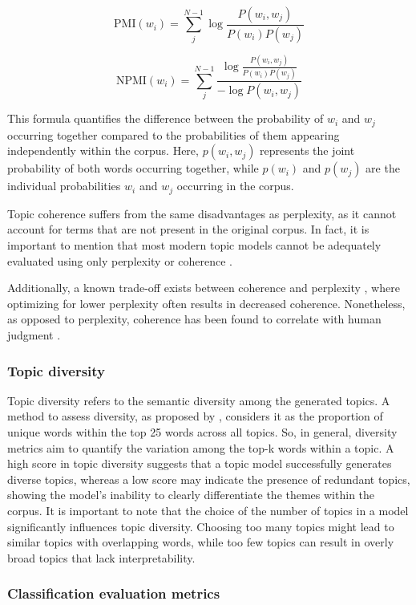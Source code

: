 \[
\text{PMI}(w_i) = \sum_{j}^{N-1} \log \frac{P(w_i, w_j)}{P(w_i) P(w_j)}
\]

\[
\text{NPMI}(w_i) = \sum_{j}^{N-1} \frac{\log \frac{P(w_i, w_j)}{P(w_i) P(w_j)}}{-\log P(w_i, w_j)}
\]

This formula quantifies the difference between the probability of $w_i$ and $w_j$ occurring together compared to the probabilities of them appearing independently within the corpus. Here, $p(w_i,w_j)$ represents the joint probability of both words occurring together, while $p(w_i)$ and $p(w_j)$ are the individual probabilities $w_i$ and $w_j$ occurring in the corpus.

Topic coherence suffers from the same disadvantages as perplexity, as it cannot account for terms that are not present in the original corpus. In fact, it is important to mention that most modern topic models cannot be adequately evaluated using only perplexity or coherence \cite{doogan_topic_2021, hoyle_is_2021}.

Additionally, a known trade-off exists between coherence and perplexity \cite{chang_reading_2009}, where optimizing for lower perplexity often results in decreased coherence. Nonetheless, as opposed to perplexity, coherence has been found to correlate with human judgment \cite{doogan_topic_2021, hoyle_is_2021, lee_human_2017, newman_evaluating_2010, mimno_optimizing_nodate, lau_machine_2014}.

\subsubsection{Topic diversity}
Topic diversity refers to the semantic diversity among the generated topics. A method to assess diversity, as proposed by \citet{dieng_topic_2020}, considers it as the proportion of unique words within the top 25 words across all topics. So, in general, diversity metrics aim to quantify the variation among the top-k words within a topic. A high score in topic diversity suggests that a topic model successfully generates diverse topics, whereas a low score may indicate the presence of redundant topics, showing the model's inability to clearly differentiate the themes within the corpus. It is important to note that the choice of the number of topics in a model significantly influences topic diversity. Choosing too many topics might lead to similar topics with overlapping words, while too few topics can result in overly broad topics that lack interpretability.

\subsubsection{Classification evaluation metrics}

